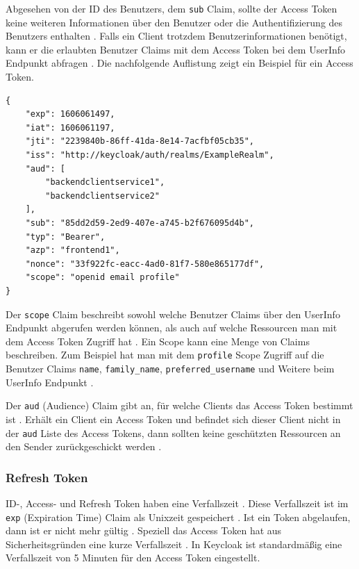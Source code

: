 Abgesehen von der ID des Benutzers, dem \texttt{sub} Claim, sollte der Access Token keine weiteren Informationen über den Benutzer oder die Authentifizierung des Benutzers enthalten \cite{EB7}. Falls ein Client trotzdem Benutzerinformationen benötigt, kann er die erlaubten Benutzer Claims mit dem Access Token bei dem UserInfo Endpunkt abfragen \cite[UserInfo Endpoint]{EB4}. Die nachfolgende Auflistung zeigt ein Beispiel für ein Access Token.

\begin{lstlisting}[caption=Beispiel Access Token, captionpos=b]
{
	"exp": 1606061497,
	"iat": 1606061197,
	"jti": "2239840b-86ff-41da-8e14-7acfbf05cb35",
	"iss": "http://keycloak/auth/realms/ExampleRealm",
	"aud": [
		"backendclientservice1",
		"backendclientservice2"
	],
	"sub": "85dd2d59-2ed9-407e-a745-b2f676095d4b",
	"typ": "Bearer",
	"azp": "frontend1",
	"nonce": "33f922fc-eacc-4ad0-81f7-580e865177df",
	"scope": "openid email profile"
}
\end{lstlisting}

Der \texttt{scope} Claim beschreibt sowohl welche Benutzer Claims über den UserInfo Endpunkt abgerufen werden können, als auch auf welche Ressourcen man mit dem Access Token Zugriff hat \cite[Requesting Claims]{EB4} \cite{EB7}. Ein Scope kann eine Menge von Claims beschreiben. Zum Beispiel hat man mit dem \texttt{profile} Scope Zugriff auf die Benutzer Claims \texttt{name}, \texttt{family\_name}, \texttt{preferred\_username} und Weitere beim UserInfo Endpunkt \cite[Requesting Claims]{EB4}. 

Der \texttt{aud} (Audience) Claim gibt an, für welche Clients das Access Token bestimmt ist \cite[ID Token]{EB4}. Erhält ein Client ein Access Token und befindet sich dieser Client nicht in der \texttt{aud} Liste des Access Tokens, dann sollten keine geschützten Ressourcen an den Sender zurückgeschickt werden \cite{EB59}.

\subsubsection{Refresh Token}

ID-, Access- und Refresh Token haben eine Verfallszeit \cite[Sec. 4.1.4]{SSEB_RFC7519} \cite[ID Token]{EB4}. Diese Verfallszeit ist im \texttt{exp} (Expiration Time) Claim als Unixzeit gespeichert \cite[Sec. 4.1.4]{SSEB_RFC7519}. Ist ein Token abgelaufen, dann ist er nicht mehr gültig \cite[Sec. 4.1.4]{SSEB_RFC7519}. Speziell das Access Token hat aus Sicherheitsgründen eine kurze Verfallszeit \cite{EB61}. In Keycloak ist standardmäßig eine Verfallszeit von 5 Minuten für den Access Token eingestellt.


